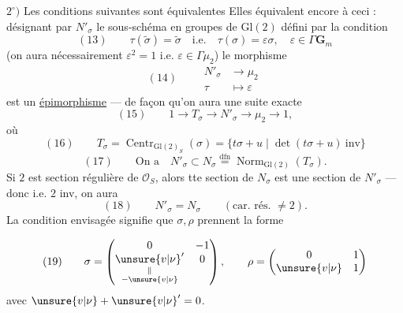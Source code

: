 $2^\circ)$ Les conditions suivantes sont équivalentes
\diagram{\[
(12)\quad\left\{
\begin{tikzcd}[ampersand replacement=\&,column sep=large,row sep=large]
\boxed{\operatorname{Tr}\sigma=0}\arrow[r,Leftrightarrow]\arrow[d,Leftrightarrow]\&\operatorname{Tr}\rho=1\arrow[r,Leftrightarrow]\arrow[d,Leftrightarrow]\&\boxed{\widetilde\sigma^2=1}\arrow[d,Leftrightarrow]\\
\boxed{\unsure{w|\omega}'=0}\&\boxed{\unsure{w|\omega}=1}\&\sigma^2\in\Gamma\mathbf G_m\arrow[d,Leftrightarrow]\\
\&\&\boxed{\sigma^2=\unsure{v|\nu}\,\mathrm{id}.}
\end{tikzcd}\right.
\]}
Elles équivalent encore à ceci : désignant par $N'_\sigma$ le sous-schéma en groupes de $\mathrm{Gl}(2)$ défini par la condition
\[
(13)\qquad \tau(\widetilde\sigma)=\widetilde\sigma\quad\text{i.e.}\quad\tau(\sigma)=\varepsilon\sigma,\quad\varepsilon\in\Gamma\mathbf G_m
\]
(on aura nécessairement $\varepsilon^2=1$ i.e. $\varepsilon\in\Gamma\mu_2$)
le morphisme
\[
(14)\qquad\begin{aligned}N'_\sigma&\longrightarrow\mu_2\\\tau&\longmapsto\varepsilon\end{aligned}
\]
est un \uline{épimorphisme} --- de façon qu'on aura une suite exacte
\[
(15)\qquad1\longrightarrow T_\sigma\longrightarrow N'_\sigma\longrightarrow\mu_2\longrightarrow1,
\]
où 
\[
(16)\qquad T_\sigma=\operatorname{Centr}_{\mathrm{Gl}(2)_S}(\sigma)=\{t\sigma+u\mid\det(t\sigma+u)\ \text{inv}\}
\]
\[
(17)\qquad\text{On a}\quad N'_\sigma\subset N_\sigma\overset{\mathrm{dfn}}=\operatorname{Norm}_{\mathrm{Gl}(2)}(T_\sigma).
\]
Si $2$ est section régulière de $\mathcal O_S$, alors tte section de $N_\sigma$  est une section de $N'_\sigma$ --- donc  i.e. $2$ inv, on aura
\[
(18)\qquad N'_\sigma=N_\sigma\qquad(\text{car. rés. }\ne2).
\]
La condition envisagée signifie que $\sigma,\rho$ prennent la forme

\[
(19)\qquad\sigma=\begin{pmatrix}0&-1\\\underset{\substack{\Vert\\-\unsure{v|\nu}}}{\unsure{v|\nu}'}&0\end{pmatrix},\qquad\rho=\begin{pmatrix}0&1\\\unsure{v|\nu}&1\end{pmatrix}
\]
avec $\unsure{v|\nu}+\unsure{v|\nu}'=0$.

